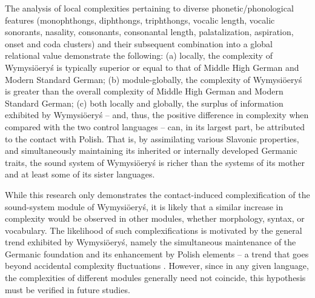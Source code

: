 \documentclass[output=paper,hidelinks]{langscibook}
\begin{document}
The analysis of local complexities pertaining to diverse phonetic{\slash}phonological features (monophthongs, diphthongs, triphthongs, vocalic length, vocalic sonorants, nasality, consonants, consonantal length, palatalization, aspiration, onset and coda clusters) and their subsequent combination into a global relational value demonstrate the following: (a) locally, the complexity of Wymysiöeryś is typically superior or equal to that of Middle High German and Modern Standard German; (b) module-globally, the complexity of Wymysiöeryś is greater than the overall complexity of Middle High German and Modern Standard German; (c) both locally and globally, the surplus of information exhibited by Wymysiöeryś – and, thus, the positive difference in complexity when compared with the two control languages – can, in its largest part, be attributed to the contact with Polish. That is, by assimilating various Slavonic properties, and simultaneously maintaining its inherited or internally developed Germanic traits, the sound system of Wymysiöeryś is richer than the systems of its mother and at least some of its sister languages.

While this research only demonstrates the contact-induced complexification of the sound-system module of Wymysiöeryś, it is likely that a similar increase in complexity would be observed in other modules, whether morphology, syntax, or vocabulary. The likelihood of such complexifications is motivated by the general trend exhibited by Wymysiöeryś, namely the simultaneous maintenance of the Germanic foundation and its enhancement by Polish elements – a trend that goes beyond accidental complexity fluctuations \citep{Andrason2021}. However, since in any given language, the complexities of different modules generally need not coincide, this hypothesis must be verified in future studies.

\sloppy
\printbibliography[heading=subbibliography,notkeyword=this]
\end{document}
